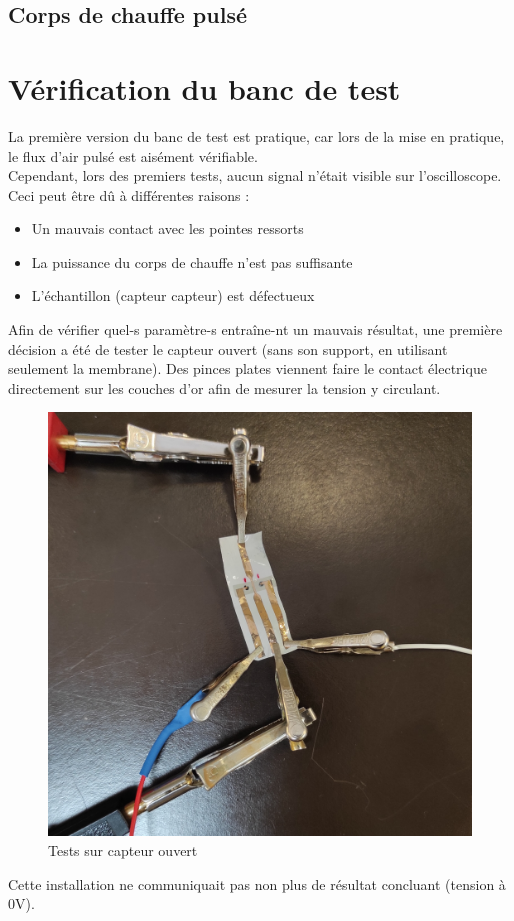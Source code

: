 \subsection{Corps de chauffe pulsé}

\section{Vérification du banc de test}
La première version du banc de test est pratique, car lors de la mise en pratique, le flux d'air pulsé est aisément vérifiable. \\
Cependant, lors des premiers tests, aucun signal n'était visible sur l'oscilloscope. Ceci peut être dû à différentes raisons :
\begin{itemize}
    \item Un mauvais contact avec les pointes ressorts\\

    \item La puissance du corps de chauffe n'est pas suffisante\\

    \item L'échantillon (capteur \gls{capteur}) est défectueux\\
\end{itemize}

Afin de vérifier quel-s paramètre-s entraîne-nt un mauvais résultat, une première décision a été de tester le \gls{capteur} ouvert (sans son support,
en utilisant seulement la membrane).
Des pinces plates viennent faire le contact électrique directement sur les couches d'or afin de mesurer la tension y circulant.
\begin{figure}[H]
    \centering
    \includegraphics[scale = 0.05]{assets/figures/CapteurOuvert.jpg}
    \caption{Tests sur capteur ouvert}
    \label{fig:capteurOuvert}
\end{figure}
Cette installation ne communiquait pas non plus de résultat concluant (tension à 0V). \\

